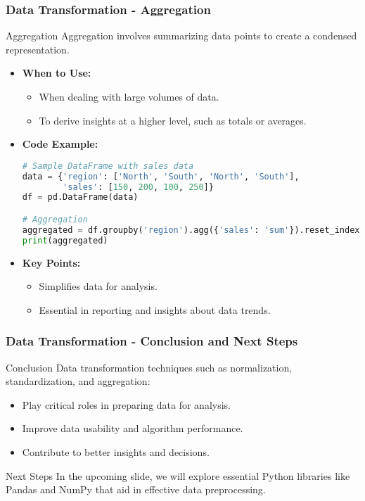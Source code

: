 \documentclass[aspectratio=169]{beamer}
\begin{document}
\begin{frame}[fragile]
    \frametitle{Data Transformation - Aggregation}
    \begin{block}{Aggregation}
        Aggregation involves summarizing data points to create a condensed representation.
        \begin{itemize}
            \item \textbf{When to Use:}
                \begin{itemize}
                    \item When dealing with large volumes of data.
                    \item To derive insights at a higher level, such as totals or averages.
                \end{itemize}
            \item \textbf{Code Example:}
            \begin{lstlisting}[language=Python]
# Sample DataFrame with sales data
data = {'region': ['North', 'South', 'North', 'South'],
        'sales': [150, 200, 100, 250]}
df = pd.DataFrame(data)

# Aggregation
aggregated = df.groupby('region').agg({'sales': 'sum'}).reset_index()
print(aggregated)
            \end{lstlisting}
            \item \textbf{Key Points:}
                \begin{itemize}
                    \item Simplifies data for analysis.
                    \item Essential in reporting and insights about data trends.
                \end{itemize}
        \end{itemize}
    \end{block}
\end{frame}

\begin{frame}[fragile]
    \frametitle{Data Transformation - Conclusion and Next Steps}
    \begin{block}{Conclusion}
        Data transformation techniques such as normalization, standardization, and aggregation:
        \begin{itemize}
            \item Play critical roles in preparing data for analysis.
            \item Improve data usability and algorithm performance.
            \item Contribute to better insights and decisions.
        \end{itemize}
    \end{block}
    
    \begin{block}{Next Steps}
        In the upcoming slide, we will explore essential Python libraries like Pandas and NumPy that aid in effective data preprocessing.
    \end{block}
\end{frame}
\end{document}
